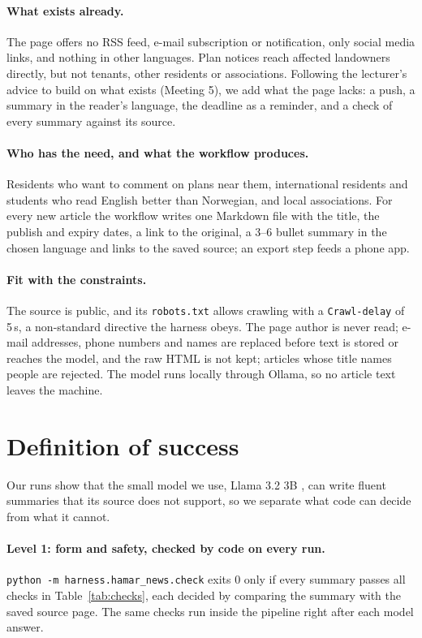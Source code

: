 \documentclass{article}
\begin{document}
\paragraph{What exists already.} The page offers no RSS feed, e-mail subscription or notification, only
social media links, and nothing in other languages. Plan notices reach affected landowners directly,
but not tenants, other residents or associations. Following the lecturer's advice to build on what
exists (Meeting 5), we add what the page lacks: a push, a summary in the reader's language, the deadline
as a reminder, and a check of every summary against its source.

\paragraph{Who has the need, and what the workflow produces.} Residents who want to comment on plans
near them, international residents and students who read English better than Norwegian, and local
associations. For every new article the workflow writes one Markdown file with the title, the publish
and expiry dates, a link to the original, a 3--6 bullet summary in the chosen language and links to the
saved source; an export step feeds a phone app.

\paragraph{Fit with the constraints.} The source is public, and its \texttt{robots.txt}
allows crawling with a \texttt{Crawl-delay} of 5\,s, a non-standard directive the harness obeys. The
page author is never read; e-mail addresses, phone numbers and names are replaced before text is
stored or reaches the model, and the raw HTML is not kept; articles whose title names people are
rejected. The model runs locally
through Ollama, so no article text leaves the machine.

\section{Definition of success}
\label{sec:success}

Our runs show that the small model we use, Llama 3.2 3B \citep{llama32}, can write fluent summaries
that its source does not support, so we separate what code can decide from what it cannot.

\paragraph{Level 1: form and safety, checked by code on every run.} \texttt{python -m
harness.hamar\_news.check} exits 0 only if every summary passes all checks in Table~\ref{tab:checks},
each decided by comparing the summary with the saved source page. The same checks run inside the
pipeline right after each model answer.
\end{document}
